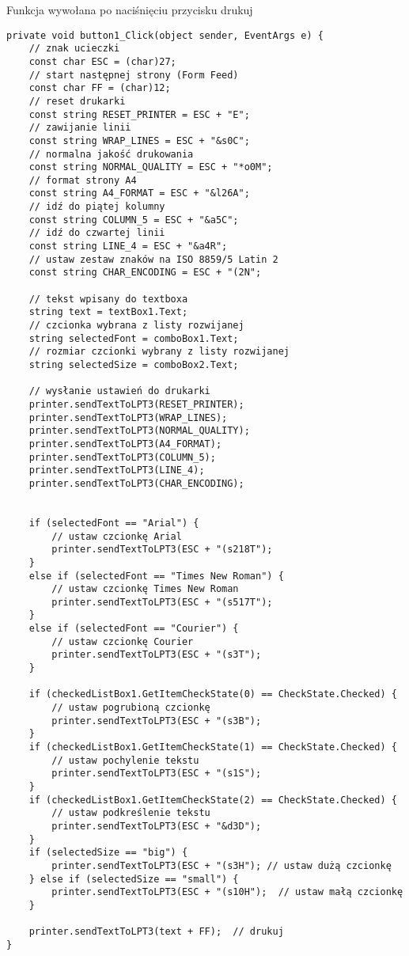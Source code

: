 \documentclass{article}
\newenvironment{longlisting}{}{}
\begin{document}
\newpage
\begin{listing}
\caption{Funkcja wywołana po naciśnięciu przycisku drukuj}
\end{listing}
\begin{longlisting}
\begin{verbatim}
private void button1_Click(object sender, EventArgs e) {
    // znak ucieczki
    const char ESC = (char)27;
    // start następnej strony (Form Feed)
    const char FF = (char)12;
    // reset drukarki
    const string RESET_PRINTER = ESC + "E";
    // zawijanie linii
    const string WRAP_LINES = ESC + "&s0C";
    // normalna jakość drukowania
    const string NORMAL_QUALITY = ESC + "*o0M";
    // format strony A4
    const string A4_FORMAT = ESC + "&l26A";
    // idź do piątej kolumny
    const string COLUMN_5 = ESC + "&a5C";
    // idź do czwartej linii
    const string LINE_4 = ESC + "&a4R";
    // ustaw zestaw znaków na ISO 8859/5 Latin 2
    const string CHAR_ENCODING = ESC + "(2N";

    // tekst wpisany do textboxa
    string text = textBox1.Text;
    // czcionka wybrana z listy rozwijanej
    string selectedFont = comboBox1.Text;
    // rozmiar czcionki wybrany z listy rozwijanej
    string selectedSize = comboBox2.Text;

    // wysłanie ustawień do drukarki
    printer.sendTextToLPT3(RESET_PRINTER);
    printer.sendTextToLPT3(WRAP_LINES);
    printer.sendTextToLPT3(NORMAL_QUALITY);
    printer.sendTextToLPT3(A4_FORMAT);
    printer.sendTextToLPT3(COLUMN_5);
    printer.sendTextToLPT3(LINE_4);
    printer.sendTextToLPT3(CHAR_ENCODING);


    if (selectedFont == "Arial") {
        // ustaw czcionkę Arial
        printer.sendTextToLPT3(ESC + "(s218T");     
    }
    else if (selectedFont == "Times New Roman") {
        // ustaw czcionkę Times New Roman
        printer.sendTextToLPT3(ESC + "(s517T");     
    }
    else if (selectedFont == "Courier") {
        // ustaw czcionkę Courier
        printer.sendTextToLPT3(ESC + "(s3T");       
    }

    if (checkedListBox1.GetItemCheckState(0) == CheckState.Checked) {
        // ustaw pogrubioną czcionkę
        printer.sendTextToLPT3(ESC + "(s3B");   
    }
    if (checkedListBox1.GetItemCheckState(1) == CheckState.Checked) {
        // ustaw pochylenie tekstu
        printer.sendTextToLPT3(ESC + "(s1S");
    }
    if (checkedListBox1.GetItemCheckState(2) == CheckState.Checked) {
        // ustaw podkreślenie tekstu
        printer.sendTextToLPT3(ESC + "&d3D");
    }
    if (selectedSize == "big") {
        printer.sendTextToLPT3(ESC + "(s3H"); // ustaw dużą czcionkę
    } else if (selectedSize == "small") {
        printer.sendTextToLPT3(ESC + "(s10H");  // ustaw małą czcionkę
    }

    printer.sendTextToLPT3(text + FF);  // drukuj
}
\end{verbatim}
\label{lst:print}
\end{longlisting}
\end{document}
